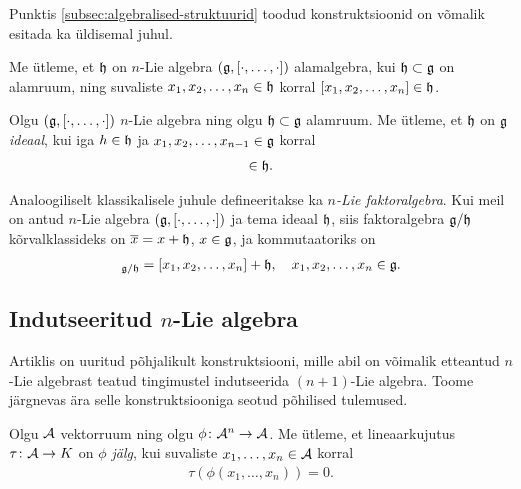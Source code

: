 Punktis \ref{subsec:algebralised-struktuurid} toodud konstruktsioonid
on võmalik esitada ka üldisemal juhul.

\begin{dfn}\label{def:n-lie-alamalgebra}
    Me ütleme, et $\mathfrak{h}$ on $n$-Lie algebra $(\mathfrak{g}, [\cdot, \dots, \cdot])$
    alamalgebra, kui $\mathfrak{h} \subset \mathfrak{g}$ on alamruum, ning suvaliste
    $x_1, x_2, \dots, x_n \in \mathfrak{h}$ korral $[x_1, x_2, \dots, x_n] \in \mathfrak{h}$.
\end{dfn}

\begin{dfn}\label{def:n-lie-algebra-ideaal}
    Olgu $(\mathfrak{g}, [\cdot, \dots, \cdot])$ $n$-Lie algebra ning olgu
    $\mathfrak{h} \subset \mathfrak{g}$ alamruum. Me ütleme, et $\mathfrak{h}$ on $\mathfrak{g}$ \emph{ideaal}, kui
    iga $h \in \mathfrak{h}$ ja $x_1, x_2, \dots, x_{n-1} \in \mathfrak{g}$ korral
    \begin{align*}
        [h, x_1, x_2, \dots, x_{n-1}] \in \h.
    \end{align*}
\end{dfn}

Analoogiliselt klassikalisele juhule defineeritakse ka
\emph{$n$-Lie faktoralgebra}.
Kui meil on antud $n$-Lie algebra $(\mathfrak{g}, [\cdot, \dots, \cdot])$ ja tema
ideaal $\mathfrak{h}$, siis faktoralgebra $\mathfrak{g}/\mathfrak{h}$ kõrvalklassideks on
$\overline{x} = x + \mathfrak{h}$, $x \in \mathfrak{g}$, ja kommutaatoriks on
\begin{align*}
    [x_1 + \h, x_2 + \h, \dots, x_n + \h]_{\g/\h} =
    [x_1, x_2, \dots, x_n] + \h,\quad
    x_1, x_2, \dots, x_n \in \g.
\end{align*}

\subsection{Indutseeritud \texorpdfstring{$n$}\ -Lie algebra}\label{subsec:indutseeritud-n-lie-alg}

Artiklis \cite{AKMS:2014} on uuritud põhjalikult konstruktsiooni, mille
abil on võimalik etteantud $n$-Lie algebrast teatud tingimustel indutseerida
$(n+1)$-Lie algebra. Toome järgnevas ära selle konstruktsiooniga seotud
põhilised tulemused.

\begin{dfn}[Jälg]
    Olgu $\mathcal{A}$ vektorruum ning olgu $\phi \colon \mathcal{A}^n \to \mathcal{A}$. Me
    ütleme, et lineaarkujutus $\tau \colon \mathcal{A} \to K$ on
    \emph{$\phi$ jälg}, kui suvaliste $x_1, \dots, x_n \in \mathcal{A}$
    korral
    \begin{align*}
        \tau \left(
            \phi \left( x_1, \dots, x_n \right)
        \right) = 0.
    \end{align*}
\end{dfn}

